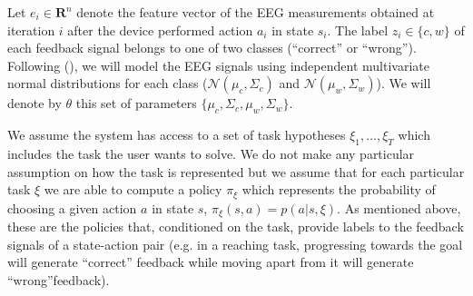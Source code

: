 \documentclass[letterpaper]{article}
\begin{document}
Let $e_i\in \mathbf{R}^n$ denote the feature vector of the EEG measurements obtained at iteration $i$ after the device performed action $a_i$ in state $s_i$. The label $z_i\in\{c,w\}$ of each feedback signal belongs to one of two classes (``correct'' or ``wrong'').
%
Following \citeauthor{blankertz2010single} (\citeyear{blankertz2010single}), we will model the EEG signals using independent multivariate normal distributions for each class ($\mathcal{N}(\mu_c, \Sigma_c)$ and $\mathcal{N}(\mu_w, \Sigma_w)$). We will denote by $\theta$ this set of parameters $\{\mu_c, \Sigma_c,\mu_w, \Sigma_w\}$.

We assume the system has access to a set of task hypotheses $\xi_1,\ldots,\xi_T$ which includes the task the user wants to solve. We do not make any particular assumption on how the task is represented but we assume that for each particular task $\xi$ we are able to compute a policy $\pi_\xi$ which represents the probability of choosing a given action $a$ in state $s$, $\pi_{\xi}(s,a) = p(a|s,\xi)$. As mentioned above, these are the policies that, conditioned on the task, provide labels to the feedback signals of a state-action pair (e.g. in a reaching task, progressing towards the goal will generate ``correct'' feedback while moving apart from it will generate ``wrong''feedback).
\end{document}
